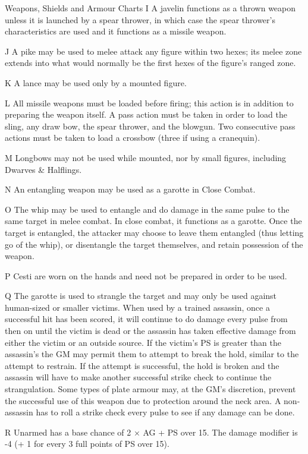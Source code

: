 \begin{Tables}{Weapons, Shields and Armour Charts}
I A javelin functions as a thrown weapon unless it is launched by a
spear thrower, in which case the spear thrower’s characteristics are
used and it functions as a missile weapon.

J A pike may be used to melee attack any figure within two hexes; its
melee zone extends into what would normally be the first hexes of the
figure’s ranged zone.

K A lance may be used only by a mounted figure. 

L All missile weapons must be loaded before firing; this action is
in addition to preparing the weapon itself. A pass action must be
taken in order to load the sling, any draw bow, the spear thrower, and
the blowgun.  Two consecutive pass actions must be taken to load a
crossbow (three if using a cranequin).

M Longbows may not be used while mounted, nor by small figures,
including Dwarves \& Halflings.

N An entangling weapon may be used as a garotte in Close Combat.

O The whip may be used to entangle and do damage in the same pulse
to the same target in melee combat.  In close combat, it functions as
a garotte.  Once the target is entangled, the attacker may choose to
leave them entangled (thus letting go of the whip), or disentangle the
target themselves, and retain possession of the weapon.

P Cesti are worn on the hands and need not be prepared in order to be
used.

Q The garotte is used to strangle the target and may only be used
against human-sized or smaller victims.  When used by a trained
assassin, once a successful hit has been scored, it will continue to
do damage every pulse from then on until the victim is dead or the
assassin has taken effective damage from either the victim or an
outside source.  If the victim’s PS is greater than the assassin’s the
GM may permit them to attempt to break the hold, similar to the
attempt to restrain.  If the attempt is successful, the hold is broken
and the assassin will have to make another successful strike check to
continue the strangulation.  Some types of plate armour may, at the
GM’s discretion, prevent the successful use of this weapon due to
protection around the neck area.  A non-assassin has to roll a strike
check every pulse to see if any damage can be done.

R Unarmed has a base chance of 2 × AG + PS over 15. The damage
modifier is -4 (+ 1 for every 3 full points of PS over 15).


\end{Tables}

